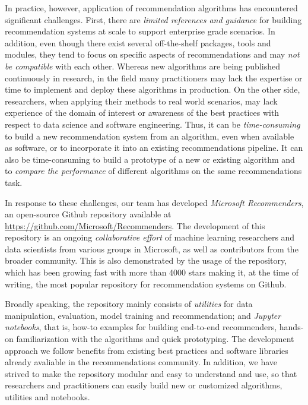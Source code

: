In practice, however, application of recommendation algorithms has encountered significant challenges. 
First, there are {\em limited references and guidance} for building recommendation systems at scale to support
enterprise grade scenarios. In addition, even though there exist several off-the-shelf packages, tools and 
modules, they tend to focus on specific aspects of recommendations 
and may {\em not be compatible} with each other. Whereas new algorithms are being published continuously in research, in the field many practitioners may lack the 
expertise or time to implement and deploy these algorithms in production. 
On the other side, researchers, when applying their methods to real world scenarios, may lack experience of the domain of interest
or awareness of the best practices with respect to data science and software engineering. Thus, it can be {\em time-consuming} to build a new recommendation system from an
algorithm, even when available as software, or to incorporate it into an existing recommendations pipeline. It can also be time-consuming to build a prototype of a new or existing algorithm and to 
{\em compare the performance} of different algorithms on the same recommendations task. 

In response to these challenges, our team has developed {\em Microsoft Recommenders}, an open-source 
Github repository available at \url{https://github.com/Microsoft/Recommenders}.
The development of this repository is an ongoing {\em collaborative effort} of machine learning researchers and data scientists from 
various groups in Microsoft, as well as contributors from the broader community.
This is also demonstrated by the usage of the repository, which has been growing fast with more than 4000 stars making it, 
at the time of writing, the most popular repository for recommendation systems on Github.%

Broadly speaking, the repository mainly consists of {\em utilities} for data manipulation, evaluation, 
model training and recommendation; and {\em Jupyter notebooks}, that is, how-to examples for building end-to-end recommenders, hands-on familiarization with the algorithms and quick prototyping. 
The development approach we follow benefits from existing best practices and software libraries already avaliable in the recommendations community.
In addition, we have strived to make the repository modular and easy to understand and use, so that researchers and practitioners can easily build
new or customized algorithms, utilities and notebooks.

